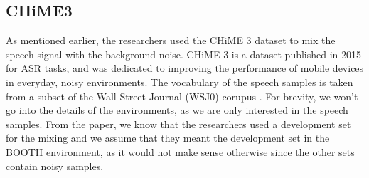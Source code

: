\documentclass[logo,bsc,singlespacing,parskip,online]{infthesis}
\begin{document}


\subsection{CHiME3}
 As mentioned earlier, the researchers used the CHiME 3 \cite{barker_third_2015} dataset to mix the speech signal with the background noise. 
CHiME 3 is a dataset published in 2015 for ASR tasks, and was dedicated to improving the performance of mobile devices 
in everyday, noisy environments. The vocabulary of the speech samples is taken from a subset of the Wall Street Journal (WSJ0) corupus \cite{TODO}.
For brevity, we won't go into the details of the environments, as we 
are only interested in the speech samples. 
From the paper, we know that the researchers used a development set for the mixing 
and we assume that they meant the development set in the BOOTH environment, as it would not make sense otherwise since the other sets contain noisy samples.
\end{document}
